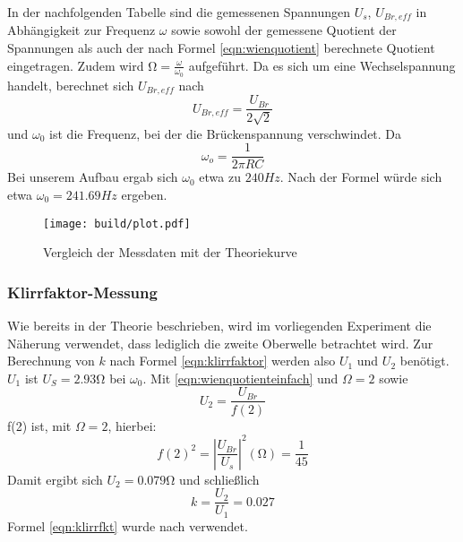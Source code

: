 In der nachfolgenden Tabelle sind die gemessenen Spannungen $U_s$, $U_{Br, eff}$ in Abhängigkeit zur Frequenz
$\omega$ sowie sowohl der gemessene Quotient der Spannungen als auch der nach
Formel \eqref{eqn:wienquotient} berechnete Quotient eingetragen. Zudem wird $\si{\ohm} =\frac{\omega}{\omega_0}$ aufgeführt.
Da es sich um eine Wechselspannung handelt, berechnet sich $U_{Br, eff}$ nach
\begin{equation}
	U_{Br, eff}=\frac{U_{Br}}{2 \sqrt{2}}
\end{equation}
und $\omega_0$ ist die Frequenz, bei der die Brückenspannung verschwindet.
Da
\begin{equation}
	\omega_o=\frac{1}{2\pi RC}
\end{equation}
Bei unserem Aufbau ergab sich $\omega_0$ etwa zu $240Hz$. Nach der Formel würde sich etwa $\omega_0=241.69Hz$ ergeben.

\begin{figure}
	\texttt{[image: build/plot.pdf]}
	\caption{Vergleich der Messdaten mit der Theoriekurve}
	\label{fig:plot1}
\end{figure}
\subsubsection{Klirrfaktor-Messung}
Wie bereits in der Theorie beschrieben, wird im vorliegenden Experiment die Näherung
verwendet, dass lediglich die zweite Oberwelle betrachtet wird.
Zur Berechnung von $k$ nach Formel \eqref{eqn:klirrfaktor} werden also $U_1$ und $U_2$ benötigt. $U_1$ ist $U_S=2.93 \si{\ohm}$ bei $\omega_0$. Mit \eqref{eqn:wienquotienteinfach} und $\Omega=2$ sowie
\begin{equation}
	\label{eqn:klirrfkt}
U_2=\frac{U_{Br}}{f(2)}
\end{equation}
f(2) ist, mit $\Omega=2$, hierbei:
\begin{equation}
f(2)^2=\left|\frac{U_{Br}}{U_s}\right|^2(\si{\ohm})=\frac{1}{45}
\end{equation}
Damit ergibt sich $U_2=0.079 \si{\ohm}$ und schließlich
\begin{equation}
k=\frac{U_2}{U_1}=0.027
\end{equation}
Formel \eqref{eqn:klirrfkt} wurde nach \cite{Anleitung} verwendet.
